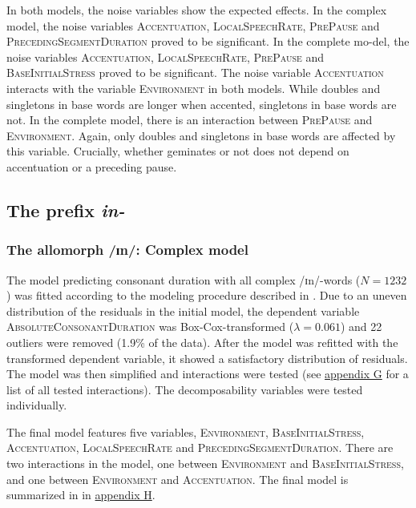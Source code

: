  In both models, the noise variables show the expected effects. In the complex model, the noise variables \textsc{Accentuation}, \textsc{LocalSpeechRate}, \textsc{PrePause} and \textsc{PrecedingSegmentDuration} proved to be significant. In the complete mo-del, the noise variables \textsc{Accentuation}, \textsc{LocalSpeechRate}, \textsc{PrePause} and \textsc{BaseInitialStress} proved to be significant.
 The noise variable \textsc{Accentuation} interacts with the variable \textsc{Environment} in both models. While doubles and singletons in base words are longer when accented, singletons in base words are not. In the complete model, there is an interaction between \textsc{PrePause} and \textsc{Environment}. Again, only doubles and singletons in base words are affected by this variable. Crucially,  whether  geminates or not does not depend on accentuation or a preceding pause. 


\subsection{The prefix \textit{in-}} \label{in experiment}

\subsubsection{The allomorph /ɪn/: Complex model}

The model predicting consonant duration with all complex /ɪn/-words ($N=1232$) was fitted according to the modeling procedure described in . Due to an uneven distribution of the residuals in the initial model, the dependent variable \textsc{AbsoluteConsonantDuration} was Box-Cox-transformed ($\lambda = 0.061$) and 22 outliers were removed (1.9\% of the data).
After the model was refitted with the transformed dependent variable, it showed a satisfactory distribution of residuals.  The model was then simplified and interactions were tested (see \hyperref[Appendix G Summaries of tested interactions in experimental study]{appendix G} for a list of all tested interactions).
The decomposability variables were tested individually.

The final model features five variables, \textsc{Environment}, \textsc{BaseInitialStress}, \textsc{Accentuation}, \textsc{LocalSpeechRate} and \textsc{PrecedingSegmentDuration}. 
There are two interactions in the model, one between \textsc{Environment} and \textsc{BaseInitialStress}, and one between \textsc{Environment} and \textsc{Accentuation}. The final model is summarized in  in \hyperref[Appendix H: Model Summaries Experiment]{appendix H}.


